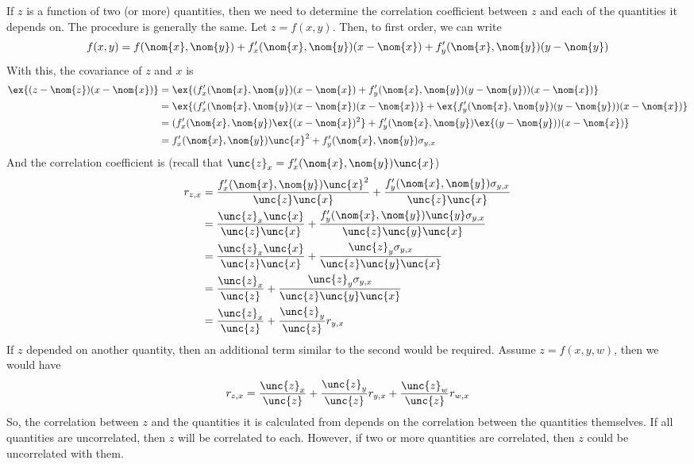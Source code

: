 \documentclass[letterpaper,10pt]{article}
\begin{document}
If $z$ is a function of two (or more) quantities, then we need to determine the correlation coefficient between $z$ and each of the quantities it depends on. The procedure is generally the same.
Let $z = f(x,y)$. Then, to first order, we can write
$$
f(x,y) = f(\nom{x},\nom{y})
      +  f^{\prime}_x(\nom{x},\nom{y}) (x-\nom{x})
      +  f^{\prime}_y(\nom{x},\nom{y}) (y-\nom{y})
$$
With this, the covariance of $z$ and $x$ is 
$$
\begin{aligned}
\ex{(z-\nom{z})(x-\nom{x})} &= \ex{ (f^{\prime}_x(\nom{x},\nom{y}) (x-\nom{x}) +  f^{\prime}_y(\nom{x},\nom{y}) (y-\nom{y}))(x - \nom{x}) } \\
                            &= \ex{ (f^{\prime}_x(\nom{x},\nom{y}) (x-\nom{x})(x - \nom{x} )} + \ex{ f^{\prime}_y(\nom{x},\nom{y}) (y-\nom{y}))(x - \nom{x}) } \\
                            &= (f^{\prime}_x(\nom{x},\nom{y}) \ex{ (x-\nom{x})^2} +  f^{\prime}_y(\nom{x},\nom{y})\ex{ (y-\nom{y}))(x - \nom{x}) } \\
                            &= f^{\prime}_x(\nom{x},\nom{y}) \unc{x}^2 + f^{\prime}_y(\nom{x},\nom{y})\sigma_{y,x}
\end{aligned}
$$
And the correlation coefficient is (recall that $\unc{z}_x = f^{\prime}_x(\nom{x},\nom{y}) \unc{x}$)
$$
\begin{aligned}
r_{z,x} &= \frac{f^{\prime}_x(\nom{x},\nom{y}) \unc{x}^2}{\unc{z}\unc{x}} + \frac{f^{\prime}_y(\nom{x},\nom{y})\sigma_{y,x}}{\unc{z}\unc{x}} \\
        &= \frac{\unc{z}_x\unc{x}}{\unc{z}\unc{x}} + \frac{f^{\prime}_y(\nom{x},\nom{y})\unc{y}\sigma_{y,x}}{\unc{z}\unc{y}\unc{x}}  \\
        &= \frac{\unc{z}_x\unc{x}}{\unc{z}\unc{x}} + \frac{\unc{z}_y\sigma_{y,x}}{\unc{z}\unc{y}\unc{x}}  \\
        &= \frac{\unc{z}_x}{\unc{z}} + \frac{\unc{z}_y\sigma_{y,x}}{\unc{z}\unc{y}\unc{x}}  \\
        &= \frac{\unc{z}_x}{\unc{z}} + \frac{\unc{z}_y}{\unc{z}}r_{y,x} 
\end{aligned}
$$
If $z$ depended on another quantity, then an additional term similar to the second would be required. Assume $z = f(x,y,w)$, then we would have
$$
r_{z,x} = \frac{\unc{z}_x}{\unc{z}} + \frac{\unc{z}_y}{\unc{z}}r_{y,x} + \frac{\unc{z}_w}{\unc{z}}r_{w,x}
$$
So, the correlation between $z$ and the quantities it is calculated from depends on the correlation between the quantities themselves. If all quantities are uncorrelated, then
$z$ will be correlated to each. However, if two or more quantities are correlated, then $z$ could be uncorrelated with them.
\end{document}
